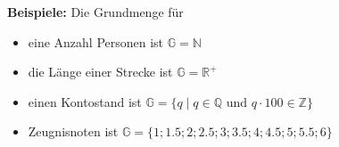 \begin{example}
  \textbf{Beispiele:} Die Grundmenge für
  \begin{itemize}[noitemsep]
    \item eine Anzahl Personen ist $\mathbb{G} = \mathbb{N}$
    \item die Länge einer Strecke ist $\mathbb{G} = \mathbb{R}^{+}$
    \item einen Kontostand ist $\mathbb{G} =
    \{q \;|\; q\in \mathbb{Q} \text{ und } q\cdot 100 \in \mathbb{Z}\}$
    \item Zeugnisnoten ist $\mathbb{G} = \{1;1.5;2;2.5;3;3.5;4;4.5;5;5.5;6\}$
  \end{itemize}
\end{example}
